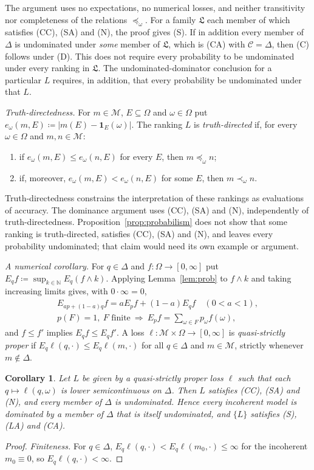\documentclass[11pt]{article}
\newenvironment{chgblockb}{\color{violet}}{}
\newtheorem{corollary}[theorem]{Corollary}
\theoremstyle{definition}
\theoremstyle{remark}
\newcommand{\M}{\mathcal M}
\newcommand{\C}{\mathcal C}
\newcommand{\Lf}{\mathfrak L}
\begin{document}
\begin{chgblockb}
The argument uses no expectations, no numerical losses, and neither transitivity nor completeness of the relations $\preceq_\omega$. For a family $\Lf$ each member of which satisfies (CC), (SA) and (N), the proof gives (S). If in addition every member of $\Delta$ is undominated under \emph{some} member of $\Lf$, which is (CA) with $\C=\Delta$, then (C) follows under (D). This does not require every probability to be undominated under every ranking in $\Lf$. The undominated-dominator conclusion for a particular $L$ requires, in addition, that every probability be undominated under that $L$.

\emph{Truth-directedness.} For $m\in\M$, $E\subseteq\Omega$ and $\omega\in\Omega$ put $e_\omega(m,E)\coloneqq|m(E)-\mathbf 1_E(\omega)|$. The ranking $L$ is \emph{truth-directed} if, for every $\omega\in\Omega$ and $m,n\in\M$:
\begin{enumerate}[label=(TD\arabic*),leftmargin=3em]
\item\label{TD1} if $e_\omega(m,E)\le e_\omega(n,E)$ for every $E$, then $m\preceq_\omega n$;
\item\label{TD2} if, moreover, $e_\omega(m,E)<e_\omega(n,E)$ for some $E$, then $m\prec_\omega n$.
\end{enumerate}
Truth-directedness constrains the interpretation of these rankings as evaluations of accuracy. The dominance argument uses (CC), (SA) and (N), independently of truth-directedness. Proposition~\ref{prop:probabilism} does not show that some ranking is truth-directed, satisfies (CC), (SA) and (N), and leaves every probability undominated; that claim would need its own example or argument.

\emph{A numerical corollary.} For $q\in\Delta$ and $f:\Omega\to[0,\infty]$ put $E_qf\coloneqq\sup_{k\in\mathbb N}E_q(f\wedge k)$. Applying Lemma~\ref{lem:prob} to $f\wedge k$ and taking increasing limits gives, with $0\cdot\infty=0$,
\begin{gather*}
E_{ap+(1-a)q}f=aE_pf+(1-a)E_qf\quad(0<a<1),\\
p(F)=1,\ F\text{ finite}\ \Longrightarrow\ E_pf=\textstyle\sum_{\omega\in F}p_\omega f(\omega),
\end{gather*}
and $f\le f'$ implies $E_qf\le E_qf'$. A loss $\ell:\M\times\Omega\to[0,\infty]$ is \emph{quasi-strictly proper} if $E_q\ell(q,\cdot)\le E_q\ell(m,\cdot)$ for all $q\in\Delta$ and $m\in\M$, strictly whenever $m\notin\Delta$.

\begin{corollary}\label{cor:probabilism}
Let $L$ be given by a quasi-strictly proper loss $\ell$ such that each $q\mapsto\ell(q,\omega)$ is lower semicontinuous on $\Delta$. Then $L$ satisfies (CC), (SA) and (N), and every member of $\Delta$ is undominated. Hence every incoherent model is dominated by a member of $\Delta$ that is itself undominated, and $\{L\}$ satisfies (S), (LA) and (CA).
\end{corollary}
\begin{proof}
\emph{Finiteness.} For $q\in\Delta$, $E_q\ell(q,\cdot)<E_q\ell(m_0,\cdot)\le\infty$ for the incoherent $m_0\equiv0$, so $E_q\ell(q,\cdot)<\infty$.


\end{proof}
\end{chgblockb}
\end{document}
